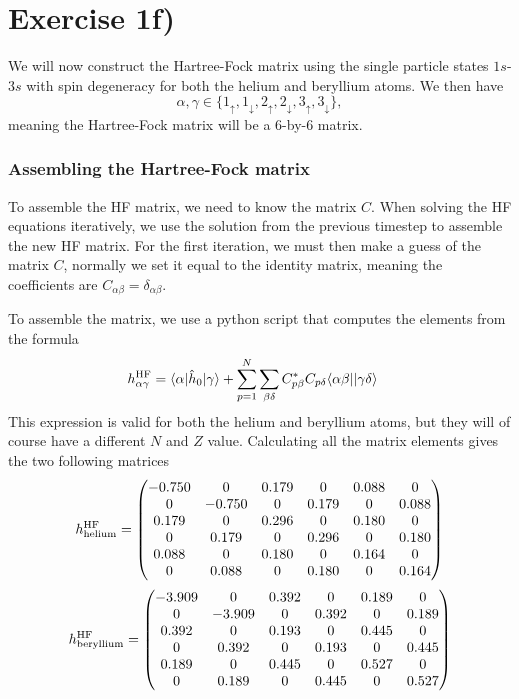 \documentclass[a4paper, 11pt, notitlepage, english]{article}
\newcommand{\braket}[2]{\langle #1 | #2 \rangle}
\newcommand{\op}[1]{\hat{#1}}
\newcommand{\braopket}[3]{\langle #1 | {#2} | #3 \rangle}
\renewcommand{\d}{{\rm d}}
\renewcommand{\u}{\uparrow}
\renewcommand{\d}{\downarrow}
\begin{document}
\clearpage

\section*{Exercise 1f)}
We will now construct the Hartree-Fock matrix using the single particle states $1s$-$3s$ with spin degeneracy for both the helium and beryllium atoms. We then have
$$\alpha, \gamma \in \{1_\u, 1_\d, 2_\u, 2_\d, 3_\u, 3_\d \},$$
meaning the Hartree-Fock matrix will be a 6-by-6 matrix. 

\subsubsection*{Assembling the Hartree-Fock matrix}
To assemble the HF matrix, we need to know the matrix $C$. When solving the HF equations iteratively, we use the solution from the previous timestep to assemble the new HF matrix. For the first iteration, we must then make a guess of the matrix $C$, normally we set it equal to the identity matrix, meaning the coefficients are $C_{\alpha\beta} = \delta_{\alpha\beta}$. 

To assemble the matrix, we use a python script that computes the elements from the formula
\begin{align*}
h_{\alpha\gamma}^{\rm HF} &= \braopket{\alpha}{\op{h}_0}{\gamma} + \sum_{p=1}^N\sum_{\beta\delta} C_{p\beta}^* C_{p \delta} \braket{\alpha\beta|}{\gamma\delta}
\end{align*}
This expression is valid for both the helium and beryllium atoms, but they will of course have a different $N$ and $Z$ value. Calculating all the matrix elements gives the two following matrices
\begin{align*}
h^{\rm HF}_{\rm helium} =
	\begin{pmatrix}
-0.750 &  0 &  0.179 &  0 &  0.088 &  0   \\
0 &  -0.750 &  0 &  0.179 &  0 &  0.088   \\
0.179 &  0 &  0.296 &  0 &  0.180 &  0   \\
0 &  0.179 &  0 &  0.296 &  0 &  0.180   \\
0.088 &  0 &  0.180 &  0 &  0.164 &  0   \\
0 &  0.088 &  0 &  0.180 &  0 &  0.164   
\end{pmatrix}
\end{align*}
\begin{align*}
h^{\rm HF}_{\rm beryllium} =
	\begin{pmatrix}
-3.909 &  0 &  0.392 &  0 &  0.189 &  0   \\
0 &  -3.909 &  0 &  0.392 &  0 &  0.189   \\
0.392 &  0 &  0.193 &  0 &  0.445 &  0   \\
0 &  0.392 &  0 &  0.193 &  0 &  0.445   \\
0.189 &  0 &  0.445 &  0 &  0.527 &  0   \\
0 &  0.189 &  0 &  0.445 &  0 &  0.527   
	\end{pmatrix}
\end{align*}
\end{document}
